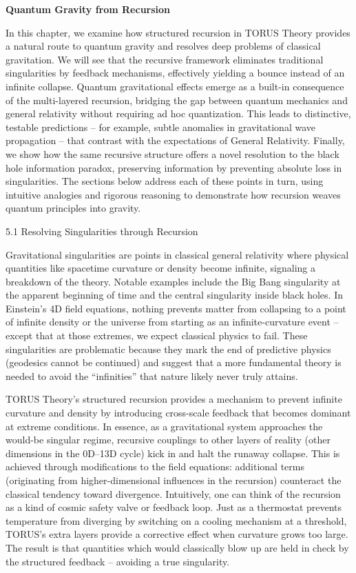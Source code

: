\documentclass[
]{article}
\author{}
\date{}
\begin{document}
\textbf{Quantum Gravity from Recursion}

In this chapter, we examine how structured recursion in TORUS Theory
provides a natural route to quantum gravity and resolves deep problems
of classical gravitation. We will see that the recursive framework
eliminates traditional singularities by feedback mechanisms, effectively
yielding a bounce instead of an infinite collapse. Quantum gravitational
effects emerge as a built-in consequence of the multi-layered recursion,
bridging the gap between quantum mechanics and general relativity
without requiring ad hoc quantization. This leads to distinctive,
testable predictions -- for example, subtle anomalies in gravitational
wave propagation -- that contrast with the expectations of General
Relativity. Finally, we show how the same recursive structure offers a
novel resolution to the black hole information paradox, preserving
information by preventing absolute loss in singularities. The sections
below address each of these points in turn, using intuitive analogies
and rigorous reasoning to demonstrate how recursion weaves quantum
principles into gravity.

5.1 Resolving Singularities through Recursion

Gravitational singularities are points in classical general relativity
where physical quantities like spacetime curvature or density become
infinite, signaling a breakdown of the theory. Notable examples include
the Big Bang singularity at the apparent beginning of time and the
central singularity inside black holes. In Einstein's 4D field
equations, nothing prevents matter from collapsing to a point of
infinite density or the universe from starting as an infinite-curvature
event -- except that at those extremes, we expect classical physics to
fail. These singularities are problematic because they mark the end of
predictive physics (geodesics cannot be continued) and suggest that a
more fundamental theory is needed to avoid the ``infinities'' that
nature likely never truly attains.

TORUS Theory's structured recursion provides a mechanism to prevent
infinite curvature and density by introducing cross-scale feedback that
becomes dominant at extreme conditions. In essence, as a gravitational
system approaches the would-be singular regime, recursive couplings to
other layers of reality (other dimensions in the 0D--13D cycle) kick in
and halt the runaway collapse. This is achieved through modifications to
the field equations: additional terms (originating from
higher-dimensional influences in the recursion) counteract the classical
tendency toward divergence. Intuitively, one can think of the recursion
as a kind of cosmic safety valve or feedback loop. Just as a thermostat
prevents temperature from diverging by switching on a cooling mechanism
at a threshold, TORUS's extra layers provide a corrective effect when
curvature grows too large. The result is that quantities which would
classically blow up are held in check by the structured feedback --
avoiding a true singularity.
\end{document}
